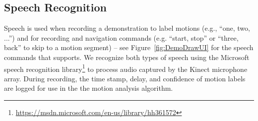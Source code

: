 




\subsection{Speech Recognition}
Speech is used when recording a demonstration to label motions (e.g., ``one, two, ...'') and for recording and navigation commands (e.g. ``start, stop'' or ``three, back'' to skip to a motion segment) -- see Figure~\ref{fig:DemoDrawUI} for the speech commands that \systemname{} supports.
%
We recognize both types of speech using the Microsoft speech recognition library\footnote{\url{https://msdn.microsoft.com/en-us/library/hh361572}} to process audio captured by the Kinect microphone array.
During recording, the time stamp, delay, and confidence of motion labels are logged for use in the the motion analysis algorithm.

